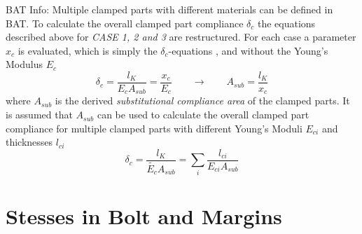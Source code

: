 \begin{colbox}{BAT Info:}
  Multiple clamped parts with different materials can be defined in BAT. To calculate the overall 
  clamped part compliance $\delta_c$ the equations described above for \emph{CASE 1, 2 and 3} are
  restructured. For each case a parameter $x_c$ is evaluated, which is simply the $\delta_c$-equations 
  ,  and  without the Young's Modulus $E_c$
  \begin{equation}
    \delta_c = \frac{l_K}{E_c A_{sub}}=\frac{x_c}{E_c} \qquad \rightarrow \qquad A_{sub}=\frac{l_K}{x_c}
  \end{equation}
  where $A_{sub}$ is the derived \emph{substitutional compliance area} of the clamped parts.
  It is assumed that $A_{sub}$ can be used to calculate the overall clamped part compliance for multiple 
  clamped parts with different Young's Moduli $E_{ci}$ and thicknesses $l_{ci}$
  \begin{equation}
    \delta_c = \frac{l_K}{\tilde{E_c} A_{sub}} = \sum_i \frac{l_{ci}}{E_{ci} A_{sub}}
  \end{equation}
\end{colbox}

\chapter{Stesses in Bolt and Margins}
